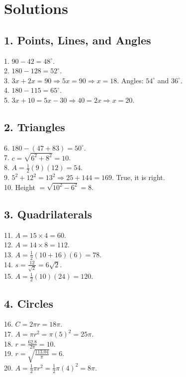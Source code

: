 \documentclass[12pt]{article}
\begin{document}
\newpage
\section*{Solutions}

\subsection*{1. Points, Lines, and Angles}
1. $90 - 42 = 48^\circ$.\\
2. $180 - 128 = 52^\circ$.\\
3. $3x + 2x = 90 \Rightarrow 5x = 90 \Rightarrow x = 18$. Angles: $54^\circ$ and $36^\circ$.\\
4. $180 - 115 = 65^\circ$.\\
5. $3x + 10 = 5x - 30 \Rightarrow 40 = 2x \Rightarrow x = 20$.

\subsection*{2. Triangles}
6. $180 - (47 + 83) = 50^\circ$.\\
7. $c = \sqrt{6^2 + 8^2} = 10$.\\
8. $A = \tfrac{1}{2}(9)(12) = 54$.\\
9. $5^2 + 12^2 = 13^2 \Rightarrow 25 + 144 = 169$. True, it is right.\\
10. Height $= \sqrt{10^2 - 6^2} = 8$.

\subsection*{3. Quadrilaterals}
11. $A = 15 \times 4 = 60$.\\
12. $A = 14 \times 8 = 112$.\\
13. $A = \tfrac{1}{2}(10 + 16)(6) = 78$.\\
14. $s = \tfrac{12}{\sqrt{2}} = 6\sqrt{2}$.\\
15. $A = \tfrac{1}{2}(10)(24) = 120$.

\subsection*{4. Circles}
16. $C = 2\pi r = 18\pi$.\\
17. $A = \pi r^2 = \pi (5)^2 = 25\pi$.\\
18. $r = \tfrac{62.8}{2\pi} = 10$.\\
19. $r = \sqrt{\tfrac{113.04}{\pi}} = 6$.\\
20. $A = \tfrac{1}{2}\pi r^2 = \tfrac{1}{2}\pi(4)^2 = 8\pi$.
\end{document}
